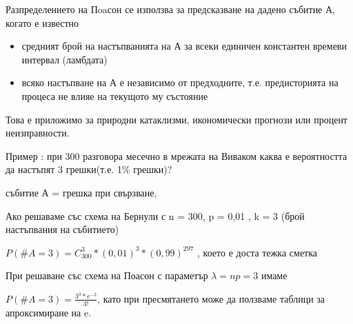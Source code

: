 \documentclass[fleqn,12pt]{article}
\begin{document}
\begin{justify}
Разпределението на Пoaсон се използва за предсказване на дадено събитие А, когато е известно
\begin{itemize}
    \item средният брой на настъпванията на А за всеки единичен константен времеви интервал (ламбдата)
    \item всяко настъпване на А е независимо от предходните, т.е. предисторията на процеса не влияе на текущото му 
    състояние
\end{itemize}

Това е приложимо за природни катаклизми, икономически прогнози или процент неизправности.

\vspace{10pt}

Пример : при 300 разговора месечно в мрежата на Виваком каква е вероятността да настъпят 3 грешки(т.е. 1\% грешки)?

събитие А = {грешка при свързване}, 

Ако решаваме със схема на Бернули с n = 300, p = 0,01 , k = 3 (брой настъпвания на събитието)

$P(\#A = 3) = C_{300}^3 * (0,01) ^ 3 * (0,99)^{297}$ , което е доста тежка сметка

При решаване със схема на Поасон с параметър $\lambda = np = 3$ имаме

$P(\#A = 3) = \frac{3^3 * e^{-3}}{3!}$, като при пресмятането може да ползваме таблици за апроксимиране на e.
\end{justify}
\end{document}
